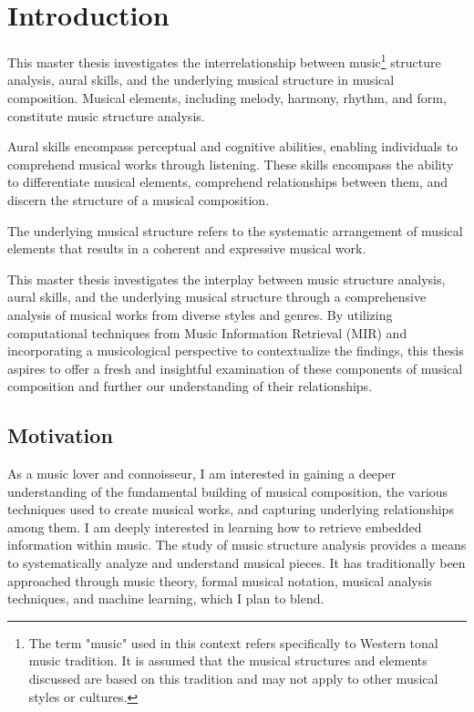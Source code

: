 \normallinespacing

\chapter{Introduction}

This master thesis investigates the interrelationship between music\footnote{The term "music" used in this context refers specifically to Western tonal music tradition. It is assumed that the musical structures and elements discussed are based on this tradition and may not apply to other musical styles or cultures.} structure analysis, aural skills, and the underlying musical structure in musical composition. Musical elements, including melody, harmony, rhythm, and form, constitute music structure analysis. 

Aural skills encompass perceptual and cognitive abilities, enabling individuals to comprehend musical works through listening. These skills encompass the ability to differentiate musical elements, comprehend relationships between them, and discern the structure of a musical composition. 

The underlying musical structure refers to the systematic arrangement of musical elements that results in a coherent and expressive musical work. 

This master thesis investigates the interplay between music structure analysis, aural skills, and the underlying musical structure through a comprehensive analysis of musical works from diverse styles and genres. By utilizing computational techniques from Music Information Retrieval (MIR) and incorporating a musicological perspective to contextualize the findings, this thesis aspires to offer a fresh and insightful examination of these components of musical composition and further our understanding of their relationships.

\section{Motivation}

As a music lover and connoisseur, I am interested in gaining a deeper understanding of the fundamental building of musical composition, the various techniques used to create musical works, and capturing underlying relationships among them. I am deeply interested in learning how to retrieve embedded information within music. The study of music structure analysis provides a means to systematically analyze and understand musical pieces. It has traditionally been approached through music theory, formal musical notation, musical analysis techniques, and machine learning, which I plan to blend.

